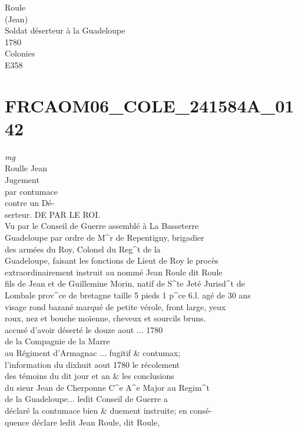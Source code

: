\documentclass{article}
\begin{document}
\begin{pages}
Roule\\
(Jean)\\
Soldat déserteur à la Guadeloupe\\
1780\\
Colonies\\
E358
\pend
\endnumbering\beginnumbering\section{FRCAOM06\_COLE\_241584A\_0142}
\vspace{0.5cm}\noindent
\textit{mg}
\footnotesize \\
Roulle Jean\\
Jugement\\
par contumace\\
contre un Dé-\\
serteur.
\normalsize \pstart
DE PAR LE ROI.\\
Vu par le Conseil de Guerre assemblé à La Basseterre\\
Guadeloupe par ordre de M\^{}r de Repentigny, brigadier\\
des armées du Roy, Colonel du Reg\^{}t de la\\
Guadeloupe, faisant les fonctions de Lieut de Roy le procès\\
extraordinairement instruit au nommé Jean Roule dit Roule\\
fils de Jean et de Guillemine Morin, natif de S\^{}te Jeté Jurisd\^{}t de\\
Lombale prov\^{}ce de bretagne taille 5 pieds 1 p\^{}ce 6.l. agé de 30 ans\\
visage rond bazané marqué de petite vérole, front large, yeux\\
roux, nez et bouche moïenne, cheveux et sourcils bruns.\\
accusé d'avoir déserté le douze aout ... 1780\\
de la Compagnie de la Marre\\
au Régiment d'Armagnac ... fugitif \& contumax;\\
l'information du dixhuit aout 1780 le récolement\\
des témoins du dit jour et an \& les conclusions\\
du sieur Jean de Cherponne C\^{}e A\^{}e Major au Regim\^{}t\\
de la Guadeloupe... ledit Conseil de Guerre a\\
déclaré la contumace bien \& duement instruite; en consé-\\
quence déclare ledit Jean Roule, dit Roule,\\

\end{pages}
\end{document}
